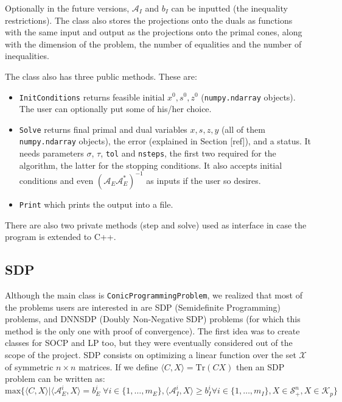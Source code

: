 \documentclass[paper=a4, fontsize=11pt]{scrartcl}
\numberwithin{equation}{section}		%
\numberwithin{figure}{section}			%
\numberwithin{table}{section}				%
\begin{document}
Optionally in the future versions, $\mathcal{A}_I$ and $b_I$ can be inputted (the inequality restrictions).
The class also stores the projections onto the duals as functions with the same input and output as the projections onto the primal cones, along with the dimension of the problem, the number of equalities and the number of inequalities.

The class also has three public methods. These are:
\begin{itemize}
\item \texttt{InitConditions} returns feasible initial $x^0,s^0,z^0$ (\texttt{numpy.ndarray} objects). The user can optionally put some of his/her choice.
\item \texttt{Solve} returns final primal and dual variables $x,s,z,y$ (all of them \texttt{numpy.ndarray} objects), the error (explained in Section [ref]), and a status. It needs parameters $\sigma$, $\tau$, \texttt{tol} and \texttt{nsteps}, the first two required for the algorithm, the latter for the stopping conditions. It also accepts initial conditions and even $(\mathcal{A}_E\mathcal{A}_E^*)^{-1}$ as inputs if the user so desires.
\item \texttt{Print} which prints the output into a file.
\end{itemize}

There are also two private methods (step and solve) used as interface in case the program is extended to C++.
\subsection{SDP}

Although the main class is \texttt{ConicProgrammingProblem}, we realized that most of the problems users are interested in are SDP (Semidefinite Programming) problems, and DNNSDP (Doubly Non-Negative SDP) problems (for which this method is the only one with proof of convergence). The first idea was to create classes for SOCP and LP too, but they were eventually considered out of the scope of the project. SDP consists on optimizing a linear function over the set $\mathcal{X}$ of symmetric $n\times n$ matrices. If we define $\langle C, X \rangle = \text{Tr}(CX)$ then an SDP problem can be written as:
\begin{equation}
\text{max}\{\langle C, X\rangle | \langle\mathcal{A}^i_E, X\rangle = b_E^i \; \forall i \in \{1,\dots,m_{E}\}, \langle\mathcal{A}^i_I,X\rangle\geq b_I^i \forall i \in \{1,\dots,m_I\}, X \in \mathcal{S}^n_+, X \in \mathcal{K}_p\}  
\end{equation}
\end{document}

